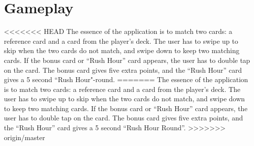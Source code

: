 \section{Gameplay}
<<<<<<< HEAD
The essence of the application is to match two cards: a reference card and a card from the player's deck. The user has to swipe up to skip when the two cards do not match, and swipe down to keep two matching cards. If the bonus card or “Rush Hour” card appears, the user has to double tap on the card. The bonus card gives five extra points, and the “Rush Hour” card gives a 5 second “Rush Hour"-round.
=======
The essence of the application is to match two cards: a reference card and a card from the player’s deck. The user has to swipe up to skip when the two cards do not match, and swipe down to keep two matching cards. If the bonus card or “Rush Hour” card appears, the user has to double tap on the card. The bonus card gives five extra points, and the “Rush Hour” card gives a 5 second “Rush Hour Round”.
>>>>>>> origin/master
